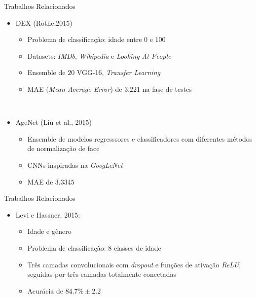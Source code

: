 \begin{frame}{Trabalhos Relacionados}
\begin{itemize}
  \item \alert{DEX} (Rothe,2015)
  \begin{itemize}
    \item Problema de classificação: idade entre $0$ e $100$
    \item Datasets: \emph{IMDb}, \emph{Wikipedia} e \emph{Looking At People}
    \item Ensemble de $20$ VGG-16, \emph{Transfer Learning}
    \item MAE (\emph{Mean Average Error}) de $3.221$ na fase de testes
  \end{itemize}
  \ \ \newline \pause
  \item \alert{AgeNet} (Liu et al., 2015)
  \begin{itemize}
    \item Ensemble de modelos regresssores e classificadores com diferentes métodos de normalização de face
    \item CNNs inspiradas na \emph{GoogLeNet}
    \item MAE de $3.3345$
  \end{itemize}
  \end{itemize}
\end{frame}

\begin{frame}{Trabalhos Relacionados}
\begin{itemize}
  \item \alert{Levi e Hassner, 2015}:
  \begin{itemize}
    \item Idade e gênero
    \item Problema de classificação: 8 classes de idade
    \item Três camadas convolucionais com \emph{dropout} e funções de ativação \emph{ReLU}, seguidas por três camadas totalmente conectadas
    \item Acurácia de $84.7\% \pm 2.2$
  \end{itemize}
\end{itemize}
\end{frame}
